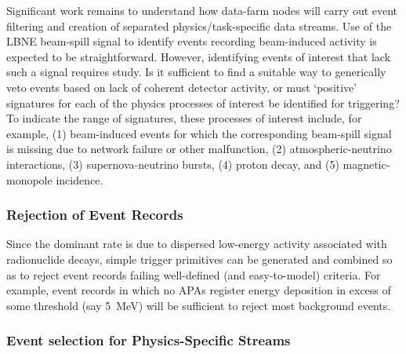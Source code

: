 Significant work remains to understand how data-farm nodes will carry out 
event filtering and creation of separated physics/task-specific data 
streams.  
Use of the LBNE beam-spill signal to identify events recording 
beam-induced activity is expected to be straightforward.  However, 
identifying events of interest that lack such a signal requires study.  
Is it sufficient to find a suitable way to generically veto events based 
on lack of coherent detector activity, or must `positive' signatures for 
each of the physics processes of interest be identified for triggering?  
To indicate the range of signatures, 
these processes of interest include, for example, (1) beam-induced events 
for which the corresponding beam-spill signal is missing due to 
network failure or other malfunction, (2) atmospheric-neutrino interactions, 
(3) supernova-neutrino bursts, (4) proton decay, and (5) magnetic-monopole 
incidence.  

\subsubsection{Rejection of Event Records}

Since the dominant rate is due to dispersed low-energy activity 
associated with radionuclide decays, simple trigger primitives can be 
generated and combined so as to reject event records failing well-defined 
(and easy-to-model) criteria.  
For example, event records in which no APAs 
register energy deposition in excess of some threshold (say 5~MeV) 
will be sufficient to reject most background events.

\subsubsection{Event selection for Physics-Specific Streams}


